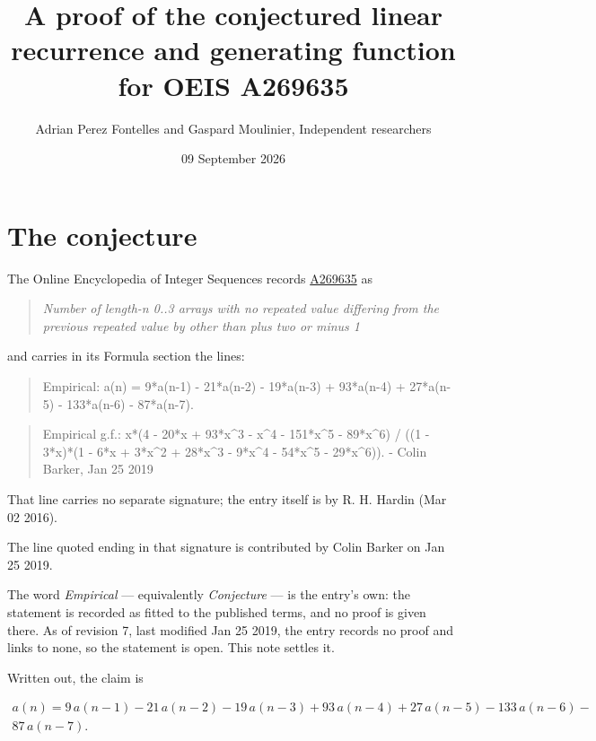 \documentclass[11pt]{article}
\title{A proof of the conjectured linear recurrence and generating function for OEIS A269635}
\author{Adrian Perez Fontelles and Gaspard Moulinier, Independent researchers}
\date{09 September 2026}
\theoremstyle{definition}
\begin{document}
\maketitle
\section{The conjecture}

The Online Encyclopedia of Integer Sequences records \href{https://oeis.org/A269635}{A269635} as

\begin{quote}\itshape Number of length-n 0..3 arrays with no repeated value differing from the previous repeated value by other than plus two or minus 1\end{quote}

and carries in its Formula section the lines:

\begin{quote}\ttfamily Empirical: a(n) = 9*a(n-1) - 21*a(n-2) - 19*a(n-3) + 93*a(n-4) + 27*a(n-5) - 133*a(n-6) - 87*a(n-7).\end{quote}

\begin{quote}\ttfamily Empirical g.f.: x*(4 - 20*x + 93*x\textasciicircum{}3 - x\textasciicircum{}4 - 151*x\textasciicircum{}5 - 89*x\textasciicircum{}6) / ((1 - 3*x)*(1 - 6*x + 3*x\textasciicircum{}2 + 28*x\textasciicircum{}3 - 9*x\textasciicircum{}4 - 54*x\textasciicircum{}5 - 29*x\textasciicircum{}6)). - Colin Barker, Jan 25 2019\end{quote}

That line carries no separate signature; the entry itself is by R. H. Hardin (Mar 02 2016).

The line quoted ending in that signature is contributed by Colin Barker on Jan 25 2019.

The word {\itshape Empirical} --- equivalently {\itshape Conjecture} --- is the entry's own: the statement is recorded as fitted to the published terms, and no proof is given there. As of revision 7, last modified Jan 25 2019, the entry records no proof and links to none, so the statement is open. This note settles it.

Written out, the claim is

\begin{multline*} a(n) = 9\,a(n-1) - 21\,a(n-2) - 19\,a(n-3) + 93\,a(n-4) + 27\,a(n-5) - 133\,a(n-6) - \\ 87\,a(n-7). \end{multline*}
\end{document}
